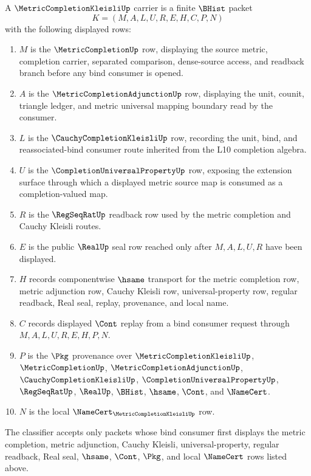 \begin{definition}
\label{def:metric-completion-kleisli-carrier}
A $\MetricCompletionKleisliUp$ carrier is a finite $\BHist$ packet
$$
K=(M,A,L,U,R,E,H,C,P,N)
$$
with the following displayed rows:
\begin{enumerate}
\item $M$ is the $\MetricCompletionUp$ row, displaying the source metric, completion carrier, separated comparison, dense-source access, and readback branch before any bind consumer is opened.
\item $A$ is the $\MetricCompletionAdjunctionUp$ row, displaying the unit, counit, triangle ledger, and metric universal mapping boundary read by the consumer.
\item $L$ is the $\CauchyCompletionKleisliUp$ row, recording the unit, bind, and reassociated-bind consumer route inherited from the L10 completion algebra.
\item $U$ is the $\CompletionUniversalPropertyUp$ row, exposing the extension surface through which a displayed metric source map is consumed as a completion-valued map.
\item $R$ is the $\RegSeqRatUp$ readback row used by the metric completion and Cauchy Kleisli routes.
\item $E$ is the public $\RealUp$ seal row reached only after $M,A,L,U,R$ have been displayed.
\item $H$ records componentwise $\hsame$ transport for the metric completion row, metric adjunction row, Cauchy Kleisli row, universal-property row, regular readback, Real seal, replay, provenance, and local name.
\item $C$ records displayed $\Cont$ replay from a bind consumer request through $M,A,L,U,R,E,H,P,N$.
\item $P$ is the $\Pkg$ provenance over $\MetricCompletionKleisliUp$, $\MetricCompletionUp$, $\MetricCompletionAdjunctionUp$, $\CauchyCompletionKleisliUp$, $\CompletionUniversalPropertyUp$, $\RegSeqRatUp$, $\RealUp$, $\BHist$, $\hsame$, $\Cont$, and $\NameCert$.
\item $N$ is the local $\NameCert_{\MetricCompletionKleisliUp}$ row.
\end{enumerate}
The classifier accepts only packets whose bind consumer first displays the metric completion, metric adjunction, Cauchy Kleisli, universal-property, regular readback, Real seal, $\hsame$, $\Cont$, $\Pkg$, and local $\NameCert$ rows listed above.
\end{definition}

